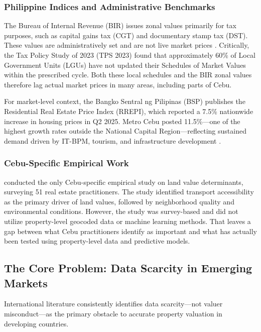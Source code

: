 \subsubsection{Philippine Indices and Administrative Benchmarks}\label{philippine-indices-and-administrative-benchmarks}

The Bureau of Internal Revenue (BIR) issues zonal values primarily for tax purposes, such as capital gains tax (CGT) and documentary stamp tax (DST). These values are administratively set and are not live market prices \parencite{bir_nd}. Critically, the Tax Policy Study of 2023 (TPS 2023) found that approximately 60\% of Local Government Units (LGUs) have not updated their Schedules of Market Values within the prescribed cycle. Both these local schedules and the BIR zonal values therefore lag actual market prices in many areas, including parts of Cebu.

For market-level context, the Bangko Sentral ng Pilipinas (BSP) publishes the Residential Real Estate Price Index (RREPI), which reported a 7.5\% nationwide increase in housing prices in Q2 2025. Metro Cebu posted 11.5\%---one of the highest growth rates outside the National Capital Region---reflecting sustained demand driven by IT-BPM, tourism, and infrastructure development \parencite{bsp2025}.

\subsubsection{Cebu-Specific Empirical Work}\label{cebu-specific-empirical-work}

\textcite{agosto2020} conducted the only Cebu-specific empirical study on land value determinants, surveying 51 real estate practitioners. The study identified transport accessibility as the primary driver of land values, followed by neighborhood quality and environmental conditions. However, the study was survey-based and did not utilize property-level geocoded data or machine learning methods. That leaves a gap between what Cebu practitioners identify as important and what has actually been tested using property-level data and predictive models.


\subsection{The Core Problem: Data Scarcity in Emerging Markets}\label{the-core-problem-data-scarcity-in-emerging-markets}

International literature consistently identifies data scarcity---not valuer misconduct---as the primary obstacle to accurate property valuation in developing countries.

